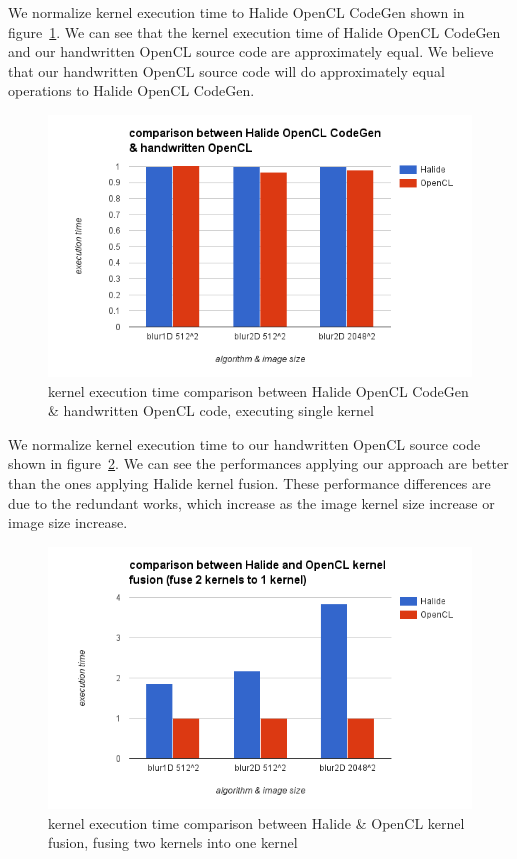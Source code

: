     We normalize kernel execution time to Halide OpenCL CodeGen shown in figure~\ref{fig:my_label_ex_5}. We can see that the kernel execution time of Halide OpenCL CodeGen and our handwritten OpenCL source code are approximately equal. We believe that our handwritten OpenCL source code will do approximately equal operations to Halide OpenCL CodeGen.

\begin{figure}[hbtp]
\centering
\includegraphics[width=14cm]{img/Halide-OpenCL-1ker-comp.png}
\caption{kernel execution time comparison between Halide OpenCL CodeGen \& handwritten OpenCL code, executing single kernel}
\label{fig:my_label_ex_5}
\end{figure}

    We normalize kernel execution time to our handwritten OpenCL source code shown in figure~\ref{fig:my_label_ex_6}. We can see the performances applying our approach are better than the ones applying Halide kernel fusion. These performance differences are due to the redundant works, which increase as the image kernel size increase or image size increase.

\begin{figure}[hbtp]
\centering
\includegraphics[width=14cm]{img/Halide-OpenCL-2ker-comp.png}
\caption{kernel execution time comparison between Halide \& OpenCL kernel fusion, fusing two kernels into one kernel}
\label{fig:my_label_ex_6}
\end{figure}

